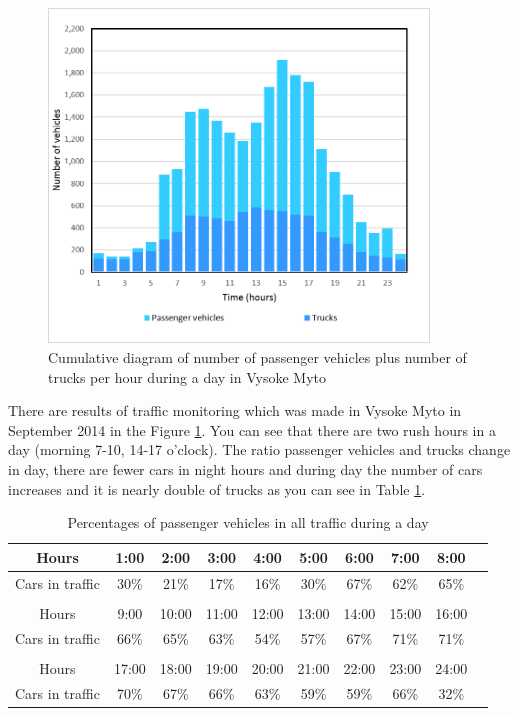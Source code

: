 \begin{figure}[ph]
\includegraphics[width=0.90\textwidth,height=0.90\textheight,keepaspectratio]{figures/Chapter_2/2_Cum_diag_traffic_VM.png}
\centering
\protect\caption{\label{fig:2_1-1}Cumulative diagram of number of passenger vehicles plus number of trucks per hour during a day in Vysoke Myto}
\end{figure}

There are results of traffic monitoring which was made in Vysoke Myto in September 2014 in the Figure \ref{fig:2_1-1}. You can see that there are two  rush hours in a day (morning 7-10, 14-17 o'clock). The ratio passenger vehicles and trucks change in day, there are fewer cars in night hours and during day the number of cars increases and it is nearly double of trucks  as you can see in Table \ref{tab:2_1-1}.

\begin{table}
\begin{centering}
\begin{tabular}{|c|c|c|c|c|c|c|c|c|c|}
\hline 
Hours & 1:00 & 2:00 & 3:00 & 4:00 & 5:00 & 6:00 & 7:00 & 8:00  \tabularnewline
\hline 
Cars in traffic & 30\% & 21\% & 17\% & 16\% & 30\% & 67\% & 62\% & 65\%  \tabularnewline
\hline 
 &  &  &  &  &  &  &  &  \tabularnewline
\hline 
Hours & 9:00 & 10:00 & 11:00 & 12:00  & 13:00 & 14:00 & 15:00 & 16:00\tabularnewline
\hline 
Cars in traffic & 66\% & 65\% & 63\% & 54\% & 57\% & 67\% & 71\% & 71\%\tabularnewline
\hline 
 &  &  &  &  &  &  &  &  \tabularnewline
\hline 
Hours & 17:00 & 18:00 & 19:00 & 20:00 & 21:00 & 22:00 & 23:00 & 24:00\tabularnewline
\hline 
Cars in traffic & 70\% & 67\% & 66\% & 63\% & 59\% & 59\% & 66\% & 32\%\tabularnewline
\hline 
\end{tabular}
\centering
\protect\caption{\label{tab:2_1-1}Percentages of passenger vehicles in all traffic during a day}
\end{centering}
\end{table}

